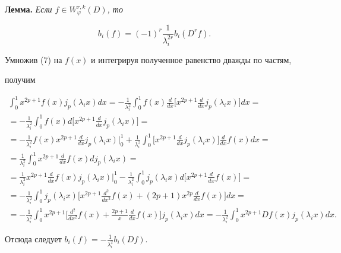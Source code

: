 \medskip 


 


{\bf Лемма.} {\it Если $f\in W^{r,k}_\varphi(D)$, то} 


$$ 


b_i(f)=(-1)^r\frac{1}{\lambda^{2r}_i}b_i(D^r f). 


$$ 


 


\begin{pf} 


Умножив (7) на $f(x)$ и интегрируя полученное равенство дважды по частям, 


получим 


\begin{multline*} 


\int^1_0 x^{2p+1}f(x)j_p(\lambda_i x)dx= 


-\frac{1}{\lambda^2_i}\int^1_0 f(x)\frac{d}{dx}\bigg [


x^{2p+1}\frac{d}{dx}j_p(\lambda_i x)\bigg]dx= \\ 


% 


=-\frac{1}{\lambda^2_i}\int^1_0 f(x)d\bigg[x^{2p+1}\frac{d}{dx} 


j_p(\lambda_i x)\bigg]= \\ 


% 


=-\frac{1}{\lambda^2_i}f(x)x^{2p+1}\frac{d}{dx}j_p(\lambda_i x) 


\Big|^1_0+\frac{1}{\lambda^2_i}\int^1_0\bigg[ 


x^{2p+1}\frac{d}{dx}j_p(\lambda_i x)\bigg]\frac{d}{dx}f(x)dx =\\ 


% 


=\frac{1}{\lambda^2_i}\int^1_0 x^{2p+1}\frac{d}{dx}f(x) 


d j_p(\lambda_i x)= \\ 


% 


=\frac{1}{\lambda^2_i}x^{2p+1}\frac{d}{dx}f(x)j_p(\lambda_i x) 


\Big|^1_0-\frac{1}{\lambda^2_i}\int^1_0 j_p(\lambda_i x)d 


\bigg[x^{2p+1}\frac{d}{dx}f(x)\bigg] =\\ 


% 


=-\frac{1}{\lambda^2_i}\int^1_0 j_p(\lambda_i x)\bigg[ x^{2p+1} 


\frac{d^2}{dx^2}f(x)+(2p+1)x^{2p}\frac{d}{dx}f(x)\bigg]dx= \\ 


% 


=-\frac{1}{\lambda^2_i}\int^1_0 x^{2p+1}\bigg[\frac{d^2}{dx^2}f(x)+ 


\frac{2p+1}{x}\frac{d}{dx}f(x)\bigg]j_p(\lambda_i x)dx= 


-\frac{1}{\lambda^2_i}\int^1_0 x^{2p+1}Df(x)j_p(\lambda_i x)dx. 


\end{multline*} 


Отсюда следует $b_i(f)=-\frac{1}{\lambda^2_i}b_i(Df)$. 


\end{pf} 
